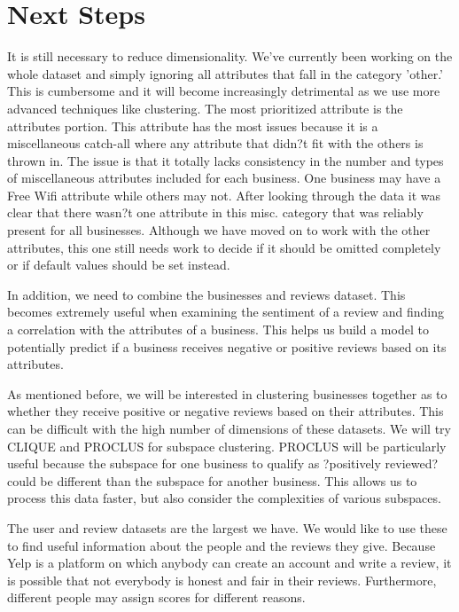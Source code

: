 \quad
\section{Next Steps}

\quad It is still necessary to reduce dimensionality. We've currently been working on the whole dataset and simply ignoring all attributes that fall in the category 'other.' This is cumbersome and it will become increasingly detrimental as we use more advanced techniques like clustering. The most prioritized attribute is the attributes portion. This attribute has the most issues because it is a miscellaneous catch-all where any attribute that didn?t fit with the others is thrown in. The issue is that it totally lacks consistency in the number and types of miscellaneous attributes included for each business. One business may have a Free Wifi attribute while others may not. After looking through the data it was clear that there wasn?t one attribute in this misc. category that was reliably present for all businesses. Although we have moved on to work with the other attributes, this one still needs work to decide if it should be omitted completely or if default values should be set instead.

\quad In addition, we need to combine the businesses and reviews dataset. This becomes extremely useful when examining the sentiment of a review and finding a correlation with the attributes of a business. This helps us build a model to potentially predict if a business receives negative or positive reviews based on its attributes. 

\quad As mentioned before, we will be interested in clustering businesses together as to whether they receive positive or negative reviews based on their attributes. This can be difficult with the high number of dimensions of these datasets. We will try CLIQUE and PROCLUS for subspace clustering. PROCLUS will be particularly useful because the subspace for one business to qualify as ?positively reviewed? could be different than the subspace for another business. This allows us to process this data faster, but also consider the complexities of various subspaces. 

\quad The user and review datasets are the largest we have. We would like to use these to find useful information about the people and the reviews they give. Because Yelp is a platform on which anybody can create an account and write a review, it is possible that not everybody is honest and fair in their reviews. Furthermore, different people may assign scores for different reasons. 

